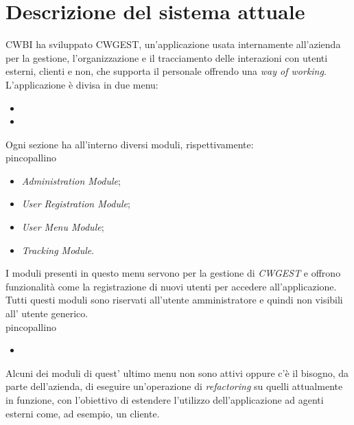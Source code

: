 \chapter{Descrizione del sistema attuale}
CWBI ha sviluppato CWGEST\glsfirstoccur , un'applicazione usata internamente all'azienda per la gestione, l'organizzazione e il tracciamento delle interazioni con utenti esterni, clienti e non, che supporta il personale offrendo una \textit{way of working}. \\
L'applicazione è divisa in due menu:
\begin{itemize}
	\item
	\item
\end{itemize}
Ogni sezione ha all'interno diversi moduli, rispettivamente:\\
pincopallino
\begin{itemize}
\item \textit{Administration Module};
\item \textit{User Registration Module};
\item \textit{User Menu Module};
\item \textit{Tracking Module}.
\end{itemize}
I moduli presenti in questo menu servono per la gestione di \textit{CWGEST} e offrono funzionalità come la registrazione di nuovi utenti per accedere all'applicazione. Tutti questi moduli sono riservati all'utente amministratore e quindi non visibili all' utente generico. \\
pincopallino
\begin{itemize}
\item
\end{itemize}
Alcuni dei moduli di quest' ultimo menu non sono attivi oppure c'è il bisogno, da parte dell'azienda, di eseguire un'operazione di \textit{refactoring\glsfirstoccur}\; su quelli attualmente in funzione, con l'obiettivo di estendere l'utilizzo dell'applicazione ad agenti esterni come, ad esempio, un cliente. 


